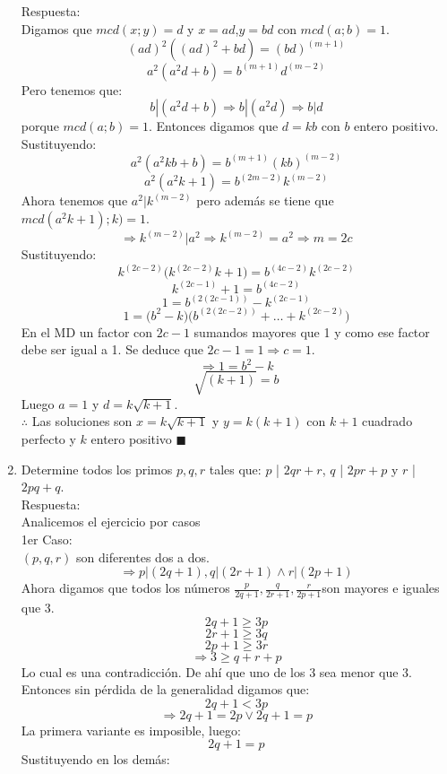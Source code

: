 \documentclass{book}
\begin{document}
\begin{enumerate}
          Respuesta:\\
          Digamos que $mcd(x;y)=d$ y $x=ad$,$y=bd$ con $mcd(a;b)=1$.
          $${(ad)}^2 ({(ad)}^2+bd)={(bd)}^{(m+1)}$$
          $$a^2 (a^2 d+b)=b^{(m+1)} d^{(m-2)}$$
          Pero tenemos que:
          $$ b|(a^2 d+b )  \Rightarrow  b|(a^2 d) \Rightarrow b|d$$
          porque $mcd(a;b)=1$.
          Entonces digamos que $d=kb$ con $b$ entero positivo.
          Sustituyendo:
          $$a^2 (a^2 kb+b)=b^{(m+1)} {(kb)}^{(m-2)}$$
          $$a^2 (a^2 k+1)=b^{(2m-2)} k^{(m-2)}$$
          Ahora tenemos que $a^2|k^{(m-2)}$  pero además se tiene que $mcd(a^2 k+1);k )=1$.\\
          $$\Rightarrow k^{(m-2)}|a^2 \Rightarrow k^{(m-2)}=a^2\Rightarrow m=2c$$
          Sustituyendo:
          $$k^{(2c-2)} \big(k^{(2c-2)} k+1\big)=b^{(4c-2)} k^{(2c-2)}$$
          $$k^{(2c-1)}+1=b^{(4c-2)}$$
          $$1=b^{(2(2c-1))}-k^{(2c-1)}$$
          $$1=\big(b^2-k)(b^{(2(2c-2))}+\ldots+k^{(2c-2)}\big)$$
          En el MD un factor con $2c-1$ sumandos mayores que 1 y como ese factor debe ser igual a 1. Se deduce que $2c-1=1\Rightarrow c=1$.
          $$\Rightarrow 1=b^2-k$$
          $$\sqrt{(k+1)}=b$$
          Luego $a=1$ y $d=k\sqrt{k+1}$.\\
          $\therefore$ Las soluciones son $x=k\sqrt{k+1}$ y $y=k(k+1)$ con $k+1$ cuadrado perfecto y $k$ entero positivo $\blacksquare$\\
    \item Determine todos los primos $p,q,r$ tales que: $p$ | $2qr+r$, $q$ | $2pr+p$ y $r$ | $2pq+q$.\\
          Respuesta:\\
          Analicemos el ejercicio por casos\\
          1er Caso: \\
          $(p,q,r)$ son diferentes dos a dos.\\
          $$\Rightarrow p|(2q + 1)  ,   q|(2r + 1)  \wedge  r|(2p + 1)$$
          Ahora digamos que todos los números $\displaystyle{\frac{p}{2q + 1}  ,   \frac{q}{2r + 1}  ,  \frac{r}{2p + 1}}$son mayores e iguales que 3.
          $$ 2q + 1\geq 3p$$
          $$2r + 1\geq 3q$$
          $$2p + 1\geq 3r$$
          $$\Rightarrow 3\geq q+r+p$$
          Lo cual es una contradicción. De ahí que uno de los 3 sea menor que 3. Entonces sin pérdida de la generalidad digamos que:
          $$2q + 1<3p$$
          $$\Rightarrow 2q + 1=2p   \vee   2q + 1=p$$
          La primera variante es imposible, luego:
          $$2q + 1=p$$
          Sustituyendo en los demás:

\end{enumerate}
\end{document}
